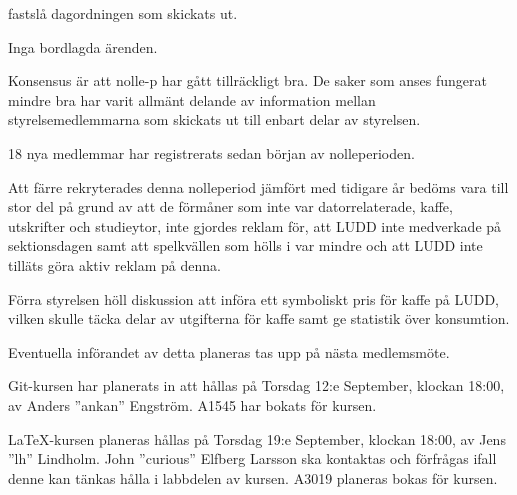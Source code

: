 \documentclass{protokoll}
\begin{document}
\newpage  


\begin{beslut}
     \att fastslå dagordningen som skickats ut.
\end{beslut}

Inga bordlagda ärenden.

Konsensus är att nolle-p har gått tillräckligt bra. De saker som anses fungerat
mindre bra har varit allmänt delande av information mellan styrelsemedlemmarna 
som skickats ut till enbart delar av styrelsen. 


18 nya medlemmar har registrerats sedan början av nolleperioden. 


Att färre rekryterades denna nolleperiod jämfört med tidigare år bedöms vara
till stor del på grund av att de förmåner som inte var datorrelaterade, kaffe,
utskrifter och studieytor, inte gjordes reklam för, att LUDD inte medverkade på
sektionsdagen samt att spelkvällen som hölls i var mindre och att LUDD inte 
tilläts göra aktiv reklam på denna. 



Förra styrelsen höll diskussion att införa ett symboliskt pris för kaffe på 
LUDD, vilken skulle täcka delar av utgifterna för kaffe samt ge statistik över
konsumtion.


Eventuella införandet av detta planeras tas upp på nästa medlemsmöte. 

Git-kursen har planerats in att hållas på Torsdag 12:e September, klockan 
18:00, av Anders ''ankan'' Engström. A1545 har bokats för kursen. 


LaTeX-kursen planeras hållas på Torsdag 19:e September, klockan 18:00, av Jens
''lh'' Lindholm. John ''curious'' Elfberg Larsson ska kontaktas och förfrågas
ifall denne kan tänkas hålla i labbdelen av kursen. A3019 planeras bokas för
kursen. 
\end{document}

